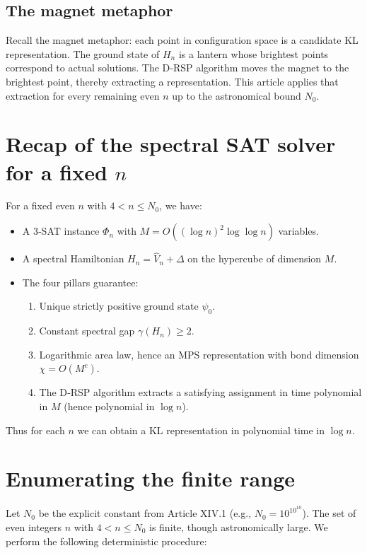 \documentclass[11pt,a4paper]{article}
\begin{document}
\subsection{The magnet metaphor}

Recall the magnet metaphor: each point in configuration space is a candidate KL representation. The ground state of \(H_n\) is a lantern whose brightest points correspond to actual solutions. The D‑RSP algorithm moves the magnet to the brightest point, thereby extracting a representation. This article applies that extraction for every remaining even \(n\) up to the astronomical bound \(N_0\).

\section{Recap of the spectral SAT solver for a fixed \(n\)}

For a fixed even \(n\) with \(4 < n \le N_0\), we have:
\begin{itemize}
\item A 3‑SAT instance \(\Phi_n\) with \(M = O((\log n)^2 \log \log n)\) variables.
\item A spectral Hamiltonian \(H_n = \hat{V}_n + \Delta\) on the hypercube of dimension \(M\).
\item The four pillars guarantee:
  \begin{enumerate}
  \item Unique strictly positive ground state \(\psi_0\).
  \item Constant spectral gap \(\gamma(H_n) \ge 2\).
  \item Logarithmic area law, hence an MPS representation with bond dimension \(\chi = O(M^c)\).
  \item The D‑RSP algorithm extracts a satisfying assignment in time polynomial in \(M\) (hence polynomial in \(\log n\)).
  \end{enumerate}
\end{itemize}
Thus for each \(n\) we can obtain a KL representation in polynomial time in \(\log n\).

\section{Enumerating the finite range}

Let \(N_0\) be the explicit constant from Article XIV.1 (e.g., \(N_0 = 10^{10^{10}}\)). The set of even integers \(n\) with \(4 < n \le N_0\) is finite, though astronomically large. We perform the following deterministic procedure:
\end{document}
